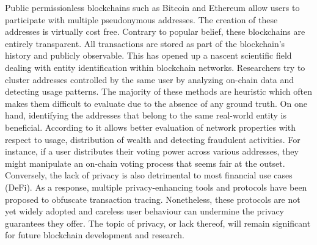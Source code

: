 \documentclass[12pt,a4paper,titlepage,oneside,english]{article}
\begin{document}
Public permissionless blockchains such as Bitcoin \citep{nakamotoBitcoin2008} and Ethereum \citep{buterin2014ethereum} allow users %
 to participate with multiple pseudonymous addresses. The creation of these addresses is virtually cost free. Contrary to popular belief, these blockchains are entirely transparent. All transactions are stored as part of the blockchain's history and publicly observable.
This has opened up a nascent scientific field dealing with entity identification within blockchain networks. Researchers try to cluster addresses controlled by the same user by analyzing on-chain data and detecting usage patterns. The majority of these methods are heuristic which often makes them difficult to evaluate due to the absence of any ground truth. \newline
On one hand, identifying the addresses that belong to the same real-world entity is beneficial. According to \cite{FV:17} it allows better evaluation of network properties with respect to usage, distribution of wealth and detecting fraudulent activities. For instance, if a user distributes their voting power across various addresses, they might manipulate an on-chain voting process that seems fair at the outset. \newline
Conversely, the lack of privacy is also detrimental to most financial use cases (DeFi). As a response, multiple privacy-enhancing tools and protocols have been proposed to obfuscate transaction tracing. 
Nonetheless, these protocols are not yet widely adopted and careless user behaviour can undermine the privacy guarantees they offer. \newline
The topic of privacy, or lack thereof, will remain significant for future blockchain development and research.

\end{document}
